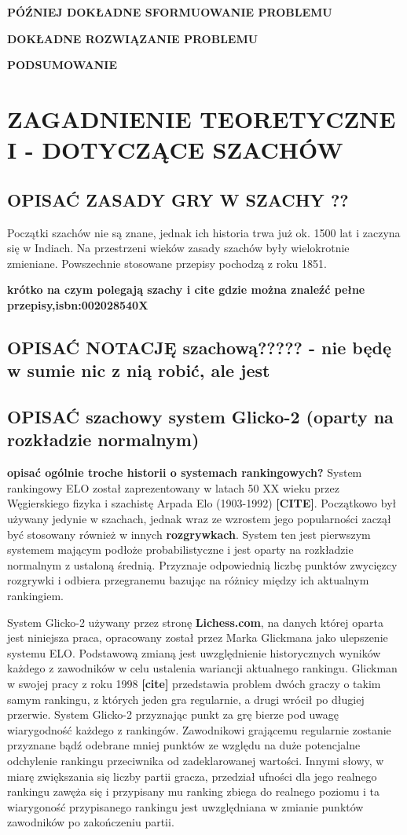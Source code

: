 \documentclass[inzynierska]{pwr_wmat_praca_dyplomowa}
\theoremstyle{plain}
\numberwithin{theorem}{chapter}
\theoremstyle{definition}
\numberwithin{theorem}{chapter}
\begin{document}
\textbf{PÓŹNIEJ DOKŁADNE SFORMUOWANIE PROBLEMU}

\textbf{DOKŁADNE ROZWIĄZANIE PROBLEMU}

\textbf{PODSUMOWANIE}


\chapter{ZAGADNIENIE TEORETYCZNE I - DOTYCZĄCE SZACHÓW}
\section{OPISAĆ ZASADY GRY W SZACHY ??}
Początki szachów nie są znane, jednak ich historia trwa już ok. 1500 lat i zaczyna się w Indiach. Na przestrzeni wieków zasady szachów były wielokrotnie zmieniane. Powszechnie stosowane przepisy pochodzą z roku 1851.

\textbf{krótko na czym polegają szachy i cite gdzie można znaleźć pełne przepisy,isbn:002028540X}


\section{OPISAĆ NOTACJĘ szachową????? - nie będę w sumie nic z nią robić, ale jest}
\section{OPISAĆ szachowy system Glicko-2 (oparty na rozkładzie normalnym)}
\textbf{opisać ogólnie troche historii o systemach rankingowych?}
System rankingowy ELO został zaprezentowany w latach 50 XX wieku przez Węgierskiego fizyka i szachistę Arpada Elo (1903-1992) \textbf{[CITE]}. Początkowo był używany jedynie w szachach, jednak wraz ze wzrostem jego popularności zaczął być stosowany również w innych \textbf{rozgrywkach}. System ten jest pierwszym systemem mającym podłoże probabilistyczne i jest oparty na rozkładzie normalnym z ustaloną średnią. Przyznaje odpowiednią liczbę punktów zwycięzcy rozgrywki i odbiera przegranemu bazując na różnicy między ich aktualnym rankingiem.


System Glicko-2 używany przez stronę \textbf{Lichess.com}, na danych której oparta jest niniejsza praca, opracowany został przez Marka Glickmana jako ulepszenie systemu ELO. Podstawową zmianą jest uwzględnienie historycznych wyników każdego z zawodników w celu ustalenia wariancji aktualnego rankingu. Glickman w swojej pracy z roku 1998 \textbf{[cite]} przedstawia problem dwóch graczy o takim samym rankingu, z których jeden gra regularnie, a drugi wrócił po długiej przerwie. System Glicko-2 przyznając punkt za grę bierze pod uwagę wiarygodność każdego z rankingów. Zawodnikowi grającemu regularnie zostanie przyznane bądź odebrane mniej punktów ze względu na duże potencjalne odchylenie rankingu przeciwnika od zadeklarowanej wartości. Innymi słowy, w miarę zwiększania się liczby partii gracza, przedział ufności dla jego realnego rankingu zawęża się i przypisany mu ranking zbiega do realnego poziomu i ta wiarygoność przypisanego rankingu jest uwzględniana w zmianie punktów zawodników po zakończeniu partii.
\end{document}
